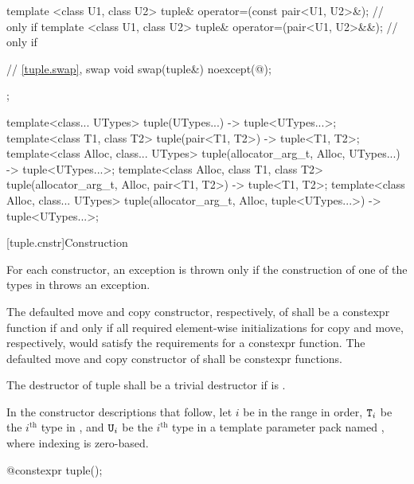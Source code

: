 \begin{codeblock}
{{      template <class U1, class U2>
        tuple& operator=(const pair<U1, U2>&);              // only if 
      template <class U1, class U2>
        tuple& operator=(pair<U1, U2>&&);                   // only if 

      // \ref{tuple.swap},  swap
      void swap(tuple&) noexcept(@\seebelow@);
    };

  template<class... UTypes>
    tuple(UTypes...) -> tuple<UTypes...>;
  template<class T1, class T2>
    tuple(pair<T1, T2>) -> tuple<T1, T2>;
  template<class Alloc, class... UTypes>
    tuple(allocator_arg_t, Alloc, UTypes...) -> tuple<UTypes...>;
  template<class Alloc, class T1, class T2>
    tuple(allocator_arg_t, Alloc, pair<T1, T2>) -> tuple<T1, T2>;
  template<class Alloc, class... UTypes>
    tuple(allocator_arg_t, Alloc, tuple<UTypes...>) -> tuple<UTypes...>;
}
\end{codeblock}

[tuple.cnstr]{Construction}

\pnum
For each  constructor, an exception is thrown only if the construction of
one of the types in  throws an exception.

\pnum
The defaulted move and copy constructor, respectively, of
 shall be a constexpr function if and only if all
required element-wise initializations for copy and move, respectively,
would satisfy the requirements for a constexpr function. The
defaulted move and copy constructor of  shall be
constexpr functions.

\pnum
The destructor of tuple shall be a trivial destructor if
is .

\pnum
In the constructor descriptions that follow, let $i$ be in the range
 in order, $\texttt{T}_i$
be the $i^\text{th}$ type in , and
$\texttt{U}_i$ be the $i^\text{th}$ type in a template parameter pack named , where indexing
is zero-based.

%
\begin{itemdecl}
@\EXPLICIT@ constexpr tuple();
\end{itemdecl}

